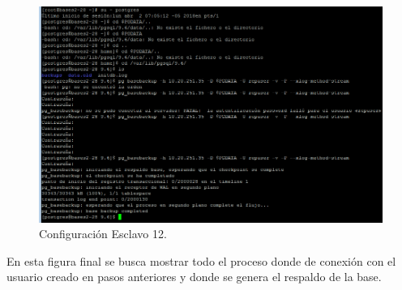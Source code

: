 \begin{figure}[H]
\centering
\includegraphics[width=\columnwidth]{eRelatedWorks/src/Captura12}
\caption{Configuración Esclavo 12. }\label{figC:12}
\end{figure}

En esta figura final se busca mostrar todo el proceso donde de conexión con el usuario creado en pasos anteriores y donde se genera el respaldo de la base.

